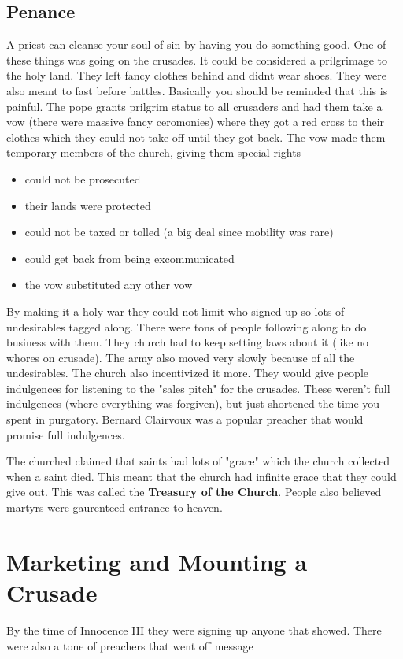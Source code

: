 \documentclass{article}
\begin{document}
\subsection*{Penance}
\label{sub:penance}
A priest can cleanse your soul of sin by having you do something good. One of these things was going on the crusades. It could be considered a prilgrimage to the holy land. They left fancy clothes behind and didnt wear shoes. They were also meant to fast before battles. Basically you should be reminded that this is painful. The pope grants prilgrim status to all crusaders and had them take a vow (there were massive fancy ceromonies) where they got a red cross to their clothes which they could not take off until they got back. The vow made them temporary members of the church, giving them special rights
\begin{itemize}
	\item could not be prosecuted
	\item their lands were protected
	\item could not be taxed or tolled (a big deal since mobility was rare)
	\item could get back from being excommunicated
	\item the vow substituted any other vow
 \end{itemize}

By making it a holy war they could not limit who signed up so lots of undesirables tagged along. There were tons of people following along to do business with them. They church had to keep setting laws about it (like no whores on crusade). The army also moved very slowly because of all the undesirables. The church also incentivized it more. They would give people indulgences for listening to the "sales pitch" for the crusades. These weren't full indulgences (where everything was forgiven), but just shortened the time you spent in purgatory. Bernard Clairvoux was a popular preacher that would promise full indulgences.

The churched claimed that saints had lots of "grace" which the church collected when a saint died. This meant that the church had infinite grace that they could give out. This was called the \textbf{Treasury of the Church}. People also believed martyrs were gaurenteed entrance to heaven.

\section*{Marketing and Mounting a Crusade}
\label{sec:marketing_and_mounting_a_crusade}
By the time of Innocence III they were signing up anyone that showed. There were also a tone of preachers that went off message
\end{document}
